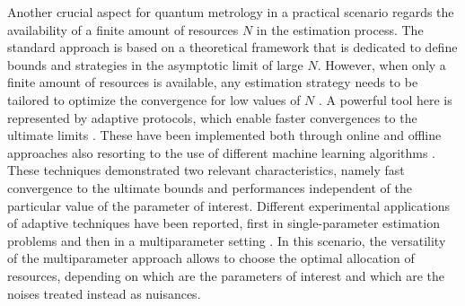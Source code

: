 \documentclass[aps,pra,twocolumn,notitlepage,superscriptaddress]{revtex4-1}
\begin{document}

Another crucial aspect for quantum metrology in a practical scenario regards the availability of a finite amount of resources $N$ in the estimation process. The standard approach is based on a theoretical framework that is dedicated to define bounds and strategies in the asymptotic limit of large $N$. However, when only a finite amount of resources is available, any estimation strategy needs to be tailored to optimize the convergence for low values of $N$ \cite{rubio2020quantum,rubio2019limited,rubio2020bayesian}. 
A powerful tool here is represented by adaptive protocols, which enable faster convergences to the ultimate limits \cite{wiseman1995adaptive,berry2000optimal}. These have been implemented both through online \cite{berni2015ab,Cimini:19} and offline \cite{hentschel2011efficient,lovett2013differential} approaches also resorting to the use of different machine learning algorithms \cite{hentschel2009adaptive,piccoloLume,rambhatla2020adaptive}. These techniques demonstrated two relevant characteristics, namely fast convergence to the ultimate bounds and performances independent of the particular value of the parameter of interest. Different experimental applications of adaptive techniques have been reported, first in single-parameter estimation problems \cite{armen2002adaptive,higgins2007entanglement,daryanoosh2018experimental,wheatley2010adaptive,piccoloLume,rambhatla2020adaptive} and then in a multiparameter setting \cite{Valeri2020}. In this scenario, the versatility of the multiparameter approach allows to choose the optimal allocation of resources, depending on which are the parameters of interest and which are the noises treated instead as nuisances. 
\end{document}
